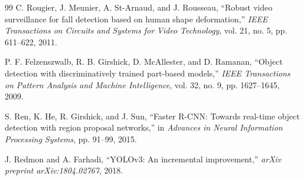 \documentclass[conference]{IEEEtran}
\begin{document}
\begin{thebibliography}{99}
C. Rougier, J. Meunier, A. St-Arnaud, and J. Rousseau, ``Robust video surveillance for fall detection based on human shape deformation,'' \textit{IEEE Transactions on Circuits and Systems for Video Technology}, vol. 21, no. 5, pp. 611--622, 2011.

P. F. Felzenszwalb, R. B. Girshick, D. McAllester, and D. Ramanan, ``Object detection with discriminatively trained part-based models,'' \textit{IEEE Transactions on Pattern Analysis and Machine Intelligence}, vol. 32, no. 9, pp. 1627--1645, 2009.

S. Ren, K. He, R. Girshick, and J. Sun, ``Faster R-CNN: Towards real-time object detection with region proposal networks,'' in \textit{Advances in Neural Information Processing Systems}, pp. 91--99, 2015.

J. Redmon and A. Farhadi, ``YOLOv3: An incremental improvement,'' \textit{arXiv preprint arXiv:1804.02767}, 2018.

\end{thebibliography}
\end{document}
